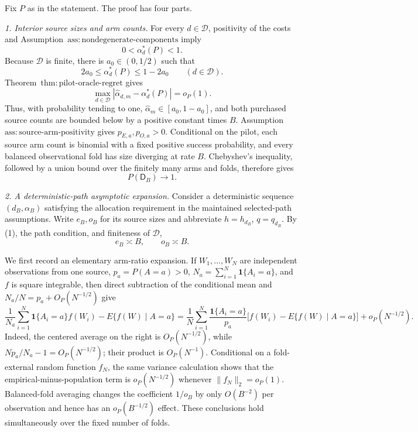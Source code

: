 Fix \(P\) as in the statement.  The proof has four parts.

\emph{1. Interior source sizes and arm counts.}
For every \(d\in\mathcal D\), positivity of the costs and Assumption~\(\mathrm{ass{:}nondegenerate\text{-}components}\) imply
\[
 0<\alpha_d^*(P)<1.
\]
Because \(\mathcal D\) is finite, there is \(a_0\in(0,1/2)\) such that
\[
 2a_0\le \alpha_d^*(P)\le1-2a_0
 \qquad(d\in\mathcal D). \tag{1}
\]
Theorem~\(\mathrm{thm{:}pilot\text{-}oracle\text{-}regret}\) gives
\[
 \max_{d\in\mathcal D}
 |\widehat\alpha_{d,m}-\alpha_d^*(P)|=o_P(1). \tag{2}
\]
Thus, with probability tending to one, \(\widehat\alpha_m\in[a_0,1-a_0]\), and both purchased source counts are bounded below by a positive constant times \(B\).  Assumption~\(\mathrm{ass{:}source\text{-}arm\text{-}positivity}\) gives \(p_{E,a},p_{O,a}>0\).  Conditional on the pilot, each source arm count is binomial with a fixed positive success probability, and every balanced observational fold has size diverging at rate \(B\).  Chebyshev's inequality, followed by a union bound over the finitely many arms and folds, therefore gives
\[
 P(\mathsf D_B)\longrightarrow1. \tag{3}
\]

\emph{2. A deterministic-path asymptotic expansion.}
Consider a deterministic sequence \((d_B,\alpha_B)\) satisfying the allocation requirement in the maintained selected-path assumptions.  Write \(e_B,o_B\) for its source sizes and abbreviate \(h=h_{d_B}\), \(q=q_{d_B}\).  By (1), the path condition, and finiteness of \(\mathcal D\),
\[
 e_B\asymp B,\qquad o_B\asymp B. \tag{4}
\]

We first record an elementary arm-ratio expansion.  If \(W_1,\ldots,W_N\) are independent observations from one source, \(p_a=P(A=a)>0\), \(N_a=\sum_{i=1}^N\mathbf 1\{A_i=a\}\), and \(f\) is square integrable, then direct subtraction of the conditional mean and \(N_a/N=p_a+O_P(N^{-1/2})\) give
\[
 \frac{1}{N_a}\sum_{i=1}^N\mathbf 1\{A_i=a\}f(W_i)
 -E\{f(W)\mid A=a\}
 =\frac1N\sum_{i=1}^N\frac{\mathbf 1\{A_i=a\}}{p_a}
 \bigl[f(W_i)-E\{f(W)\mid A=a\}\bigr]
 +o_P(N^{-1/2}). \tag{5}
\]
Indeed, the centered average on the right is \(O_P(N^{-1/2})\), while \(Np_a/N_a-1=O_P(N^{-1/2})\); their product is \(O_P(N^{-1})\).  Conditional on a fold-external random function \(f_N\), the same variance calculation shows that the empirical-minus-population term is \(o_P(N^{-1/2})\) whenever \(\|f_N\|_2=o_P(1)\).  Balanced-fold averaging changes the coefficient \(1/o_B\) by only \(O(B^{-2})\) per observation and hence has an \(o_P(B^{-1/2})\) effect.  These conclusions hold simultaneously over the fixed number of folds.

